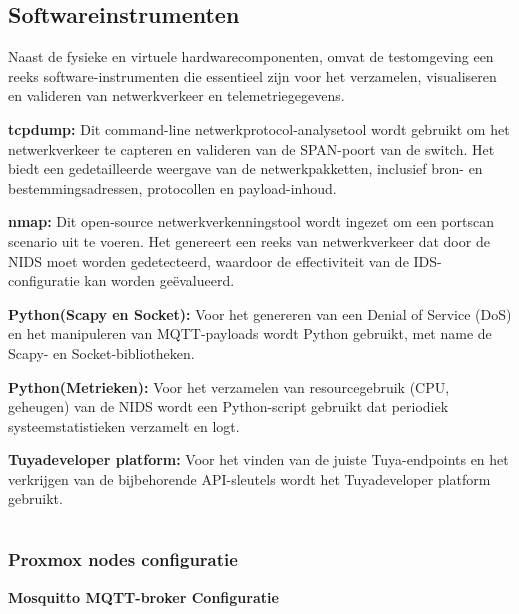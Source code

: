 \section{Softwareinstrumenten}
Naast de fysieke en virtuele hardwarecomponenten, omvat de testomgeving een reeks software-instrumenten die essentieel zijn voor het verzamelen, visualiseren en valideren van netwerkverkeer en telemetriegegevens.
\vspace{1em}

\textbf{tcpdump:} Dit command-line netwerkprotocol-analysetool wordt gebruikt om het netwerkverkeer te capteren en valideren van de SPAN-poort van de switch. Het biedt een gedetailleerde weergave van de netwerkpakketten, inclusief bron- en bestemmingsadressen, protocollen en payload-inhoud.

\vspace{1em}

\textbf{nmap:} Dit open-source netwerkverkenningstool wordt ingezet om een portscan scenario uit te voeren. Het genereert een reeks van netwerkverkeer dat door de NIDS moet worden gedetecteerd, waardoor de effectiviteit van de IDS-configuratie kan worden geëvalueerd.

\vspace{1em}

\textbf{Python(Scapy en Socket):} Voor het genereren van een Denial of Service (DoS) en het manipuleren van MQTT-payloads wordt Python gebruikt, met name de Scapy- en Socket-bibliotheken.

\vspace{1em}

\textbf{Python(Metrieken):} Voor het verzamelen van resourcegebruik (CPU, geheugen) van de NIDS wordt een Python-script gebruikt dat periodiek systeemstatistieken verzamelt en logt.

\vspace{1em}

\textbf{Tuyadeveloper platform:} Voor het vinden van de juiste Tuya-endpoints en het verkrijgen van de bijbehorende API-sleutels wordt het Tuyadeveloper platform gebruikt. 


\chapter{}%
\label{ch:Installatie en configuratie}
\subsection{Proxmox nodes configuratie}
\vspace{1em}
\textbf{Mosquitto MQTT-broker Configuratie}


